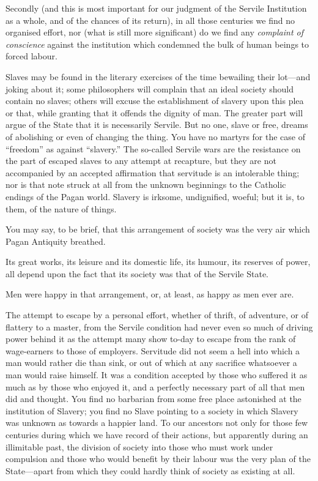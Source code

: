 \documentclass{book}
\begin{document}
Secondly (and this is most important for our judgment of the Servile Institution as a whole, and of the chances of its return), in all those centuries we find no organised effort, nor (what is still more significant) do we find any \emph{complaint of conscience} against the institution which condemned the bulk of human beings to forced labour.

Slaves may be found in the literary exercises of the time bewailing their lot—and joking about it; some philosophers will complain that an ideal society should contain no slaves; others will excuse the establishment of slavery upon this plea or that, while granting that it offends the dignity of man. The greater part will argue of the State that it is necessarily Servile. But no one, slave or free, dreams of abolishing or even of changing the thing. You have no martyrs for the case of “freedom” as against “slavery.” The so-called Servile wars are the resistance on the part of escaped slaves to any attempt at recapture, but they are not accompanied by an accepted affirmation that servitude is an intolerable thing; nor is that note struck at all from the unknown beginnings to the Catholic endings of the Pagan world. Slavery is irksome, undignified, woeful; but it is, to them, of the nature of things.

You may say, to be brief, that this arrangement of society was the very air which Pagan Antiquity breathed.

Its great works, its leisure and its domestic life, its humour, its reserves of power, all depend upon the fact that its society was that of the Servile State.

Men were happy in that arrangement, or, at least, as happy as men ever are.

The attempt to escape by a personal effort, whether of thrift, of adventure, or of flattery to a master, from the Servile condition had never even so much of driving power behind it as the attempt many show to-day to escape from the rank of wage-earners to those of employers. Servitude did not seem a hell into which a man would rather die than sink, or out of which at any sacrifice whatsoever a man would raise himself. It was a condition accepted by those who suffered it as much as by those who enjoyed it, and a perfectly necessary part of all that men did and thought. You find no barbarian from some free place astonished at the institution of Slavery; you find no Slave pointing to a society in which Slavery was unknown as towards a happier land. To our ancestors not only for those few centuries during which we have record of their actions, but apparently during an illimitable past, the division of society into those who must work under compulsion and those who would benefit by their labour was the very plan of the State—apart from which they could hardly think of society as existing at all.
\end{document}
